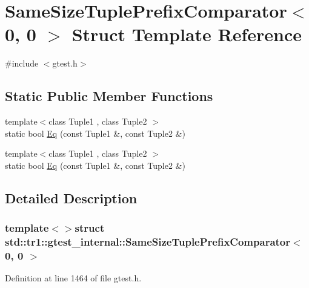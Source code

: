 \hypertarget{structstd_1_1tr1_1_1gtest__internal_1_1SameSizeTuplePrefixComparator_3_010_00_010_01_4}{\section{\-Same\-Size\-Tuple\-Prefix\-Comparator$<$ 0, 0 $>$ \-Struct \-Template \-Reference}
\label{d1/d5b/structstd_1_1tr1_1_1gtest__internal_1_1SameSizeTuplePrefixComparator_3_010_00_010_01_4}
}


{\ttfamily \#include $<$gtest.\-h$>$}

\subsection*{\-Static \-Public \-Member \-Functions}
\begin{DoxyCompactItemize}
\item 
{\footnotesize template$<$class Tuple1 , class Tuple2 $>$ }\\static bool \hyperlink{structstd_1_1tr1_1_1gtest__internal_1_1SameSizeTuplePrefixComparator_3_010_00_010_01_4_ad3a83facb6e38b235cfb0616e558a57c}{\-Eq} (const \-Tuple1 \&, const \-Tuple2 \&)
\item 
{\footnotesize template$<$class Tuple1 , class Tuple2 $>$ }\\static bool \hyperlink{structstd_1_1tr1_1_1gtest__internal_1_1SameSizeTuplePrefixComparator_3_010_00_010_01_4_ad3a83facb6e38b235cfb0616e558a57c}{\-Eq} (const \-Tuple1 \&, const \-Tuple2 \&)
\end{DoxyCompactItemize}


\subsection{\-Detailed \-Description}
\subsubsection*{template$<$$>$struct std\-::tr1\-::gtest\-\_\-internal\-::\-Same\-Size\-Tuple\-Prefix\-Comparator$<$ 0, 0 $>$}



\-Definition at line 1464 of file gtest.\-h.



